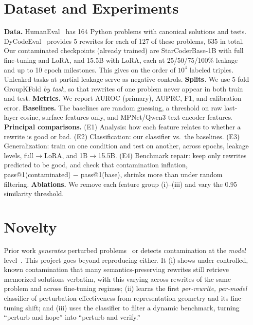 \documentclass[10pt,twocolumn,letterpaper]{article}
\begin{document}
\section{Dataset and Experiments}

\textbf{Data.} HumanEval~\cite{humaneval} has 164 Python problems with canonical solutions and tests. DyCodeEval~\cite{dycodeeval} provides 5 rewrites for each of 127 of these problems, 635 in total. Our contaminated checkpoints (already trained) are StarCoderBase-1B with full fine-tuning and LoRA, and 15.5B with LoRA, each at 25/50/75/100\% leakage and up to 10 epoch milestones. This gives on the order of $10^4$ labeled triples. Unleaked tasks at partial leakage serve as negative controls.
\textbf{Splits.} We use 5-fold GroupKFold \emph{by task}, so that rewrites of one problem never appear in both train and test.
\textbf{Metrics.} We report AUROC (primary), AUPRC, F1, and calibration error.
\textbf{Baselines.} The baselines are random guessing, a threshold on raw last-layer cosine, surface features only, and MPNet/Qwen3 text-encoder features.
\textbf{Principal comparisons.}
(E1) Analysis: how each feature relates to whether a rewrite is good or bad.
(E2) Classification: our classifier vs.\ the baselines.
(E3) Generalization: train on one condition and test on another, across epochs, leakage levels, full$\to$LoRA, and 1B$\to$15.5B.
(E4) Benchmark repair: keep only rewrites predicted to be good, and check that contamination inflation, pass@1(contaminated) $-$ pass@1(base), shrinks more than under random filtering.
\textbf{Ablations.} We remove each feature group (i)--(iii) and vary the 0.95 similarity threshold.

\section{Novelty}

Prior work \emph{generates} perturbed problems~\cite{dycodeeval,evoeval} or detects contamination at the \emph{model} level~\cite{mink}. This project goes beyond reproducing either. It (i) shows under controlled, known contamination that many semantics-preserving rewrites still retrieve memorized solutions verbatim, with this varying across rewrites of the same problem and across fine-tuning regimes; (ii) learns the first \emph{per-rewrite, per-model} classifier of perturbation effectiveness from representation geometry and its fine-tuning shift; and (iii) uses the classifier to filter a dynamic benchmark, turning ``perturb and hope'' into ``perturb and verify.''
\end{document}
